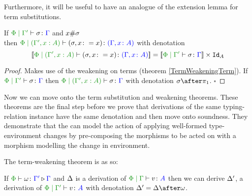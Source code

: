 \documentclass{Report}
\begin{document}
Furthermore, it will be useful to have an analogue of the extension lemma for term substitutions.


\begin{lemma}
    If $\etyperelation{\P}{\G'}{\si}{\G}$ and $x\#\sigma$\\ then $\etyperelation{\P}{(\G',x: A)}{(\si, x\setto x)}{(\gax)}$ with denotation $$\deno{\etyperelation{\P}{(\G',x: A)}{(\si, x\setto x)}{(\gax)}} = \deno{\etyperelation{\P}{\G'}{\si}{\G}} \times \Id{A}$$
\end{lemma}

\begin{proof}
     Makes use of the weakening on terms (theorem \ref{TermWeakeningTerm}). If $\etyperelation{\P}{\G'}{\si}{\G}$ then $\etyperelation{\P}{(\G', x:A) }{\si}{\G}$ with denotation $\si\after\p$. $\square$
\end{proof}


Now we can move onto the term substitution and weakening theorems. These theorems are the final step before we prove that derivations of the same typing-relation instance have the same denotation and then move onto soundness. They demonstrate that the can model the action of applying well-formed type-environment changes by pre-composing the morphisms to be acted on with a morphism modelling the change in environment.

The term-weakening theorem is as so: 

\begin{theorem}\label{TermWeakeningTerm}
    If $\pewrel{\w}{\G'}{\G}$ and $\Delta$ is a derivation of $\gpetyperelation{v}{A}$ then we can derive $\Delta'$, a derivation of $\etyperelation{\P}{\G'}{v}{A}$ with denotation $\D' = \D\after\w$.
\end{theorem}
\end{document}
